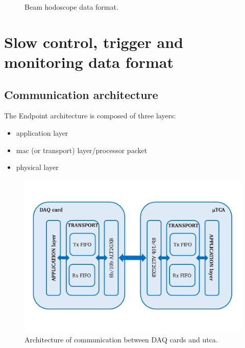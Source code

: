 \begin{figure}[htbp]
\caption{Beam hodoscope data format.}
\label{chapappA::fig::hodoDataForm}
\end{figure}


\section{Slow control, trigger and monitoring data format}\label{chapappA::sec::slowCTrigMonDataFormat}
\subsection{Communication architecture}\label{chapappA::subsec::commArch}
The Endpoint architecture is composed of three layers:
\begin{itemize}
	\item application layer
	\item mac (or transport) layer/processor packet
	\item physical layer
\end{itemize}

	\begin{figure} [!hbtp]
	\centering
	\caption{Architecture of communication between DAQ cards and \gls{utca}.}
	\label{chapappA::fig::commDAQuTCA}
	\includegraphics[width=1\textwidth]{03_GraphicFiles/appendixA_dataFormat/DAQ_uTCAImage.pdf}
	\end{figure}


